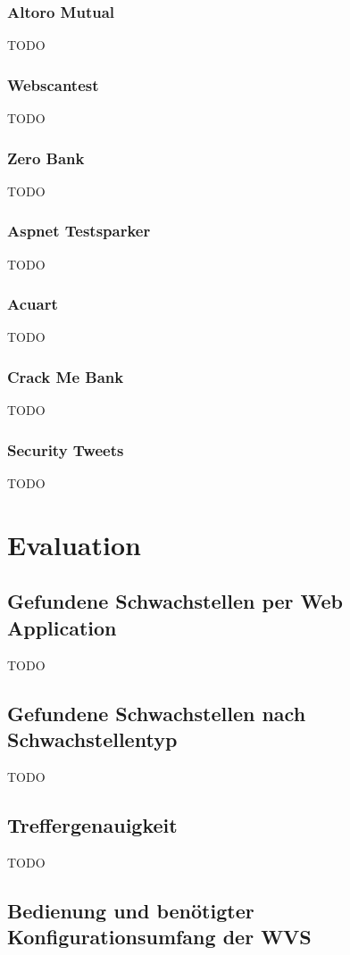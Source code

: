 \documentclass[12pt,oneside,a4paper,parskip]{scrbook}
\begin{document}
  \subsection{Altoro Mutual}
  TODO
  \subsection{Webscantest}
  TODO
  \subsection{Zero Bank}
  TODO
  \subsection{Aspnet Testsparker}
  TODO
  \subsection{Acuart}
  TODO
  \subsection{Crack Me Bank}
  TODO
  \subsection{Security Tweets}
  TODO


\chapter{Evaluation}
  \section{Gefundene Schwachstellen per Web Application}
  TODO
  \section{Gefundene Schwachstellen nach Schwachstellentyp}
  TODO
  \section{Treffergenauigkeit}
  TODO
  \section{Bedienung und benötigter Konfigurationsumfang der WVS}
\end{document}
